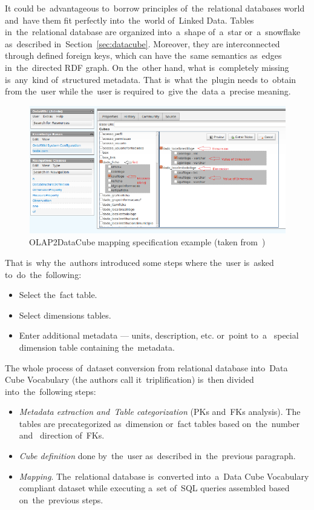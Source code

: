 It could be~advantageous to~borrow principles of~the~relational databases world and~have them
fit perfectly into~the~world of~Linked Data. Tables in~the~relational database 
are organized into~a~shape of~a~star or~a~snowflake as~described in~Section~\ref{sec:datacube}.
Moreover, they are interconnected through defined foreign keys,
which can have the~same semantics as~edges in~the~directed RDF graph.
On the~other hand, what is~completely missing is~any~kind of~structured
metadata. That is~what the~plugin needs to~obtain from the~user while the~user
is required to~give the~data a~precise meaning.

\begin{figure}
	\centering
	\includegraphics[width=140mm]{img/olapimport.png}
	\caption{OLAP2DataCube mapping specification example (taken from~\cite{olap2dc-paper})}
	\label{fig:olap2dc-screen}
\end{figure}

\begin{sloppypar}
That is~why the~authors introduced some steps where the~user is~asked to~do~the~following:
\begin{itemize}
  \item Select the~fact table.
  \item Select dimensions tables.
  \item Enter additional metadata --- units, description, etc. or~point to~a~  special dimension table containing the~metadata.
\end{itemize}

The whole process of~dataset conversion from relational database into~Data Cube Vocabulary
(the authors call it~triplification) is~then divided into~the~following steps:
\begin{itemize}
  \item \emph{Metadata extraction and~Table categorization} (PKs and~FKs analysis). The~  tables are precategorized as~dimension or~fact tables based on~the~number and~  direction of~FKs.
  \item \emph{Cube definition} done by~the~user as~described in~the~previous paragraph.
  \item \emph{Mapping}. The~relational database is~converted into~a~Data Cube 
  Vocabulary compliant dataset while executing a~set of~SQL queries assembled 
  based on~the~previous steps.
\end{itemize}
\end{sloppypar}


